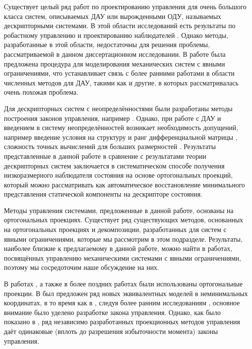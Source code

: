 Существует целый ряд работ по проектированию управления для очень большого класса систем, описываемых ДАУ или вырожденными ОДУ, называемых дескрипторными системами. В этой области исследований есть результаты по робастному управлению и проектированию наблюдателей \cite{Cheng2018, Darouach2014}. Однако методы, разработанные в этой области, недостаточны для решения проблемы, рассматриваемой в данном диссертационном исследовании. В работе \cite{Aghili2003} была предложена процедура для моделирования механических систем с явными ограничениями, что устанавливает связь с более ранними работами в области численных методов для ДАУ, такими как \cite{Liang1987} и другие, в которых рассматривалась очень похожая проблема. 

Для дескрипторных систем с неопределённостями были разработаны методы построения законов управления, например \cite{LIN19993319, Darouach2014}. Однако, при работе с ДАУ и введением в систему неопределённостей возникает необходимость допущений, например введение условия на структуру и ранг дифференциальной матрицы \cite{Cheng2017}, сложность точных вычислений для больших размерностей \cite{Zhang2006}. Результаты представленные в данной работе в сравнение с результатами теории дескрипторных систем заключается в систематическом способе получения низкоразмерного наблюдателя состояния на основе ортогональных проекций, который можно рассматривать как автоматическое восстановление минимального представления статической компоненты на дескрипторе состояния. 

Методы управления системами, предложенные в данной работе, основаны на ортогональных проекциях. Существует ряд существующих методов, основанных на ортогональных проекциях и декомпозиции, разработанных для систем с явными ограничениями, которые мы рассмотрим в этом подразделе. Результаты, наиболее близкие к предлагаемому в данной работе, можно найти в работах, посвящённых управлению механическими системами с явными ограничениями, поэтому мы сосредоточим наше обсуждение на них.

В работах \cite{Aghili2003, Aghili2005}, а также в более поздних работах \cite{Mistry2010, Righetti2011, Righetti2013} были использованы ортогональные проекции. В \cite{Aghili2003, Aghili2005} был предложен ряд новых эквивалентных моделей в неминимальных координатах, в то время как в \cite{Mistry2010, Righetti2011, Righetti2013}, следуя более ранним исследованиям \cite{Khatib2007, Sentis2005}, основное внимание было уделено разработке закона управления. Однако, как было показано в \cite{Righetti2011}, ряд независимо разработанных проекционных методов управления даёт одинаковые (вплоть до разрешения избыточности момента) законы управления.

